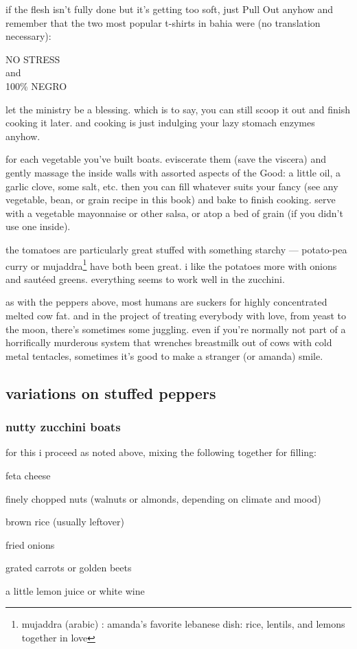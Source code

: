 if the flesh isn't fully done but it's getting too soft, just Pull Out anyhow 
and remember that the two most popular t-shirts in bahia were (no translation 
necessary):

\mbox{\hskip2cm}\textsf{NO STRESS}\\
\mbox{\hskip1cm}and\\
\mbox{\hskip2cm}\textsf{100\% NEGRO}

let the ministry be a blessing. which is to say, you can still scoop it out 
and finish cooking it later. and cooking is just indulging your lazy stomach 
enzymes anyhow. 

for each vegetable you've built boats. eviscerate them (save the viscera) and 
gently massage the inside walls with assorted aspects of the Good: a little 
oil, a garlic clove, some salt, etc. then you can fill whatever suits your 
fancy (see any vegetable, bean, or grain recipe in this book) and bake to 
finish cooking. serve with a vegetable mayonnaise or other salsa, or atop a 
bed of grain (if you didn't use one inside).

the tomatoes are particularly great stuffed with something starchy --- 
potato-pea curry or mujaddra\footnote{mujaddra (arabic) : amanda's favorite 
lebanese dish: rice, lentils, and lemons together in love} have both been 
great. i like the potatoes more with onions and saut\'{e}ed greens. everything 
seems to work well in the zucchini.

as with the peppers above, most humans are suckers for highly concentrated 
melted cow fat. and in the project of treating everybody with love, from yeast 
to the moon, there's sometimes some juggling. even if you're normally not part 
of a horrifically murderous system that wrenches breastmilk out of cows with 
cold metal tentacles, sometimes it's good to make a stranger (or amanda) smile.

\subsection{variations on stuffed peppers}

\subsubsection{nutty zucchini boats}

for this i proceed as noted above, mixing the following together for filling:

\begin{ingredients}
  \item feta cheese
  \item finely chopped nuts (walnuts or almonds, depending on climate and mood)
  \item brown rice (usually leftover)
  \item fried onions
  \item grated carrots or golden beets
  \item a little lemon juice or white wine
\end{ingredients}

